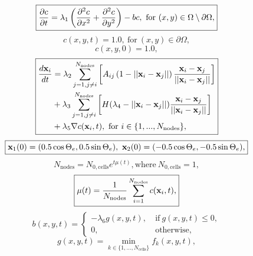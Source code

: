 \begin{equation} \label{eqn:EOMs_PDE}
    \boxed{\pdv{c}{t} = \lambda_1 \left(\pdv[2]{c}{x} + \pdv[2]{c}{y} \right) - bc,
     \ \textrm{for} \ (x,y) \in \Omega \setminus \partial \Omega,}
\end{equation}
\begin{equation}
    \boxed{c(x,y,t) = 1.0, \ \textrm{for} \ (x,y) \in \partial \Omega,}
\end{equation}
\begin{equation}
    \boxed{c(x,y,0) = 1.0,}
\end{equation}
\begin{equation}\label{eqn:EOMs_ODE}
    \boxed{
    \begin{split}
        \frac{d \vb{x}_i}{d t} 
         &= \lambda_2 \sum_{j=1, j \neq i}^{N_{\textrm{nodes}}} \left[ A_{ij}\left( 1- ||\vb{x}_i - \vb{x}_j|| \right) \frac{\vb{x}_i - \vb{x}_j}{||\vb{x}_i - \vb{x}_j||} \right]\\
         &+ \lambda_3 \sum_{j=1, j \neq i}^{N_{\textrm{nodes}}} \left[H(\lambda_4 - ||\vb{x}_i - \vb{x}_j||) \frac{\vb{x}_i - \vb{x}_j}{||\vb{x}_i - \vb{x}_j||}     \right]\\ 
         &+ \lambda_5 \nabla c (\vb{x}_i, t), \ \textrm{for} \ i \in \{ 1, ...,N_{\textrm{nodes}} \},  
    \end{split}}
\end{equation}
\begin{equation}
    \boxed{\vb{x}_1(0) = (0.5 \cos{\Theta_e}, 0.5 \sin{\Theta_e}), \ \vb{x}_2(0) = (-0.5 \cos{\Theta_e}, -0.5 \sin{\Theta_e}), }
\end{equation}
\begin{equation} \label{eqn:expGrowth}
    \boxed{N_{\textrm{nodes}} = N_{0, \textrm{cells}} e^{t \mu(t)}, \textrm{where} \ N_{0, \textrm{cells}} = 1, }
\end{equation}
\begin{equation}\label{eqn:growthRate}
    \boxed{\mu(t) = \frac{1}{N_{\textrm{nodes}}}\sum_{i=1}^{N_{\textrm{nodes}}} c(\vb{x}_i, t), } 
\end{equation}
\begin{equation} \label{eqn:biomass}
    \boxed{
    b(x,y,t) = 
    \begin{cases}
        -\lambda_6 g(x,y,t), & \ \textrm{if} \ g(x,y,t) \leq 0, \\
            0, &    \ \textrm{otherwise},
    \end{cases}
    }
\end{equation}
\begin{equation}
    \boxed{
    g(x,y,t) = \min_{k \in \{  1, ..., N_{\textrm{cells}}\}} f_k (x,y,t),
    }
\end{equation}
